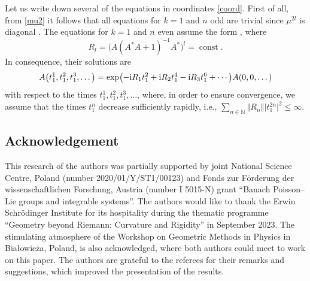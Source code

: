 \documentclass[pdftex]{sigma}
\theoremstyle{definition}
\numberwithin{equation}{section}
\newcommand{\norm}[1]{\left\Vert#1\right\Vert}
\newcommand{\N}{\mathbb N}
\DeclareMathOperator{\const}{const}
\begin{document}
Let us write down several of the equations in coordinates \eqref{coord}. First of all, from \eqref{mu2} it follows that all equations for $k=1$ and $n$ odd are trivial since $\mu^{2l}$ is diagonal
.
The equations for $k=1$ and $n$ even assume the form
,
where
\[ R_l = \bigl(A (A^* A+1)^{-1} A^*\bigr)^l = \const. \]
In consequence, their solutions are
\[ A\bigl(t_1^1,t_1^2,t_1^3,\dots\bigr)= \exp\bigl(-{\rm i}R_{1}{t_1^2}+
{\rm i}R_{2}{t_1^4}-{\rm i}R_{3}{t_1^6}+\cdots\bigr) A(0,0,\dots) \]
with respect to the times $t_1^1,t_1^2,t_1^3,\dots$, where, in order to ensure convergence, we assume that the times $t^n_1$ decrease sufficiently rapidly, i.e.,
$\sum_{n\in\N} \norm{R_n} \bigl|t^{2n}_1\bigr|^2 \leq \infty$.


\subsection*{Acknowledgement}
This research of the authors was partially supported by joint National Science Centre, Poland (number 2020/01/Y/ST1/00123) and Fonds zur F\"orderung der wissenschaftlichen Forschung, Austria (number I 5015-N) grant ``Banach Poisson--Lie groups and integrable systems''.
The authors would like to thank the Erwin Schr\"odinger Institute for its hospitality during the thematic programme ``Geometry beyond Riemann: Curvature and Rigidity'' in September 2023. The stimulating atmosphere of the Workshop on Geometric Methods in Physics in Białowie\.za, Poland, is also acknowledged, where both authors could meet to work on this paper.
The authors are grateful to the referees for their remarks and suggestions, which improved the presentation of the results.
\end{document}
